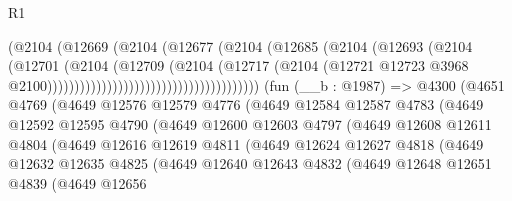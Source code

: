 \begin{lexlean}{R1}
\begin{coremodule}
                                                  (@2104
                                                    (@12669
                                                      (@2104
                                                        (@12677
                                                          (@2104
                                                            (@12685
                                                              (@2104
                                                                (@12693
                                                                  (@2104
                                                                    (@12701
                                                                      (@2104
                                                                        (@12709
                                                                          (@2104
                                                                            (@12717
                                                                              (@2104
                                                                                (@12721
                                                                                  @12723
                                                                                  @3968
                                                                                  @2100)))))))))))))))))))))))))))))))))))))))
    (fun (__b : @1987) =>
    @4300
      (@4651
        @4769
        (@4649
          @12576
          @12579
          @4776
          (@4649
            @12584
            @12587
            @4783
            (@4649
              @12592
              @12595
              @4790
              (@4649
                @12600
                @12603
                @4797
                (@4649
                  @12608
                  @12611
                  @4804
                  (@4649
                    @12616
                    @12619
                    @4811
                    (@4649
                      @12624
                      @12627
                      @4818
                      (@4649
                        @12632
                        @12635
                        @4825
                        (@4649
                          @12640
                          @12643
                          @4832
                          (@4649
                            @12648
                            @12651
                            @4839
                            (@4649
                              @12656

\end{coremodule}
\end{lexlean}
